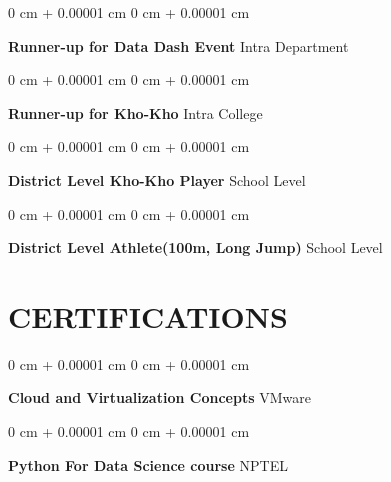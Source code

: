 \documentclass[10pt, letterpaper]{article}
\newenvironment{onecolentry}{
    \begin{adjustwidth}{
        0 cm + 0.00001 cm
    }{
        0 cm + 0.00001 cm
    }
}{
    \end{adjustwidth}
} %
\begin{document}
       \begin{onecolentry}
           \fontsize{12pt}{12pt} \textbf{Runner-up for Data Dash Event}\AND%
  \fontsize{11pt}{11pt}\selectfont Intra Department   %
        \end{onecolentry}

         \vspace{0.2 cm}

       \begin{onecolentry}
           \fontsize{12pt}{12pt} \textbf{Runner-up for Kho-Kho}\AND%
  \fontsize{11pt}{11pt}\selectfont Intra College   %
        \end{onecolentry}

         \vspace{0.2 cm}

       \begin{onecolentry}
           \fontsize{12pt}{12pt} \textbf{District Level Kho-Kho Player}\AND%
  \fontsize{11pt}{11pt}\selectfont School Level   %
        \end{onecolentry}
        \vspace{0.2 cm}

        \begin{onecolentry}
           \fontsize{12pt}{12pt} \textbf{District Level Athlete(100m, Long Jump)}\AND%
  \fontsize{11pt}{11pt}\selectfont School Level   %
        \end{onecolentry}
        

         \vspace{0.2 cm}


         \section{\Large CERTIFICATIONS}

        \vspace{0.2 cm}

       \begin{onecolentry}
           \fontsize{12pt}{12pt} \textbf{Cloud and Virtualization Concepts}\AND%
  \fontsize{11pt}{11pt}\selectfont VMware   %
        \end{onecolentry}

         \vspace{0.2 cm}

       \begin{onecolentry}
           \fontsize{12pt}{12pt} \textbf{Python For Data Science course}\AND%
  \fontsize{11pt}{11pt}\selectfont NPTEL   %
        \end{onecolentry}
\end{document}
